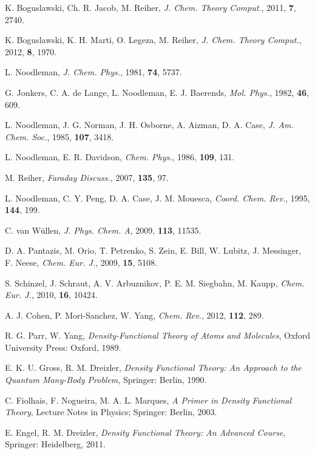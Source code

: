 \documentclass[%
 preprint, linenumbers,
 amsmath,amssymb,
 aps, physrev,
]{revtex4-2}
\begin{document}
\begin{thebibliography}{144}
 K. Boguslawski, Ch. R. Jacob, M. Reiher, \textit{J. Chem. Theory Comput.}, 2011, \textbf{7}, 2740.

 K. Boguslawski, K. H. Marti, O. Legeza, M. Reiher, \textit{J. Chem. Theory Comput.}, 2012, \textbf{8}, 1970.

 L. Noodleman, \textit{J. Chem. Phys.}, 1981, \textbf{74}, 5737.

 G. Jonkers, C. A. de Lange, L. Noodleman, E. J. Baerends, \textit{Mol. Phys.}, 1982, \textbf{46}, 609.

 L. Noodleman, J. G. Norman, J. H. Osborne, A. Aizman, D. A. Case, \textit{J. Am. Chem. Soc.}, 1985, \textbf{107}, 3418.

 L. Noodleman, E. R. Davidson, \textit{Chem. Phys.}, 1986, \textbf{109}, 131.

 M. Reiher, \textit{Faraday Discuss.}, 2007, \textbf{135}, 97.

 L. Noodleman, C. Y. Peng, D. A. Case, J. M. Mouesca, \textit{Coord. Chem. Rev.}, 1995, \textbf{144}, 199.

 C. van Wüllen, \textit{J. Phys. Chem. A}, 2009, \textbf{113}, 11535.

 D. A. Pantazis, M. Orio, T. Petrenko, S. Zein, E. Bill, W. Lubitz, J. Messinger, F. Neese, \textit{Chem. Eur. J.}, 2009, \textbf{15}, 5108.

 S. Schinzel, J. Schraut, A. V. Arbuznikov, P. E. M. Siegbahn, M. Kaupp, \textit{Chem. Eur. J.}, 2010, \textbf{16}, 10424.

 A. J. Cohen, P. Mori-Sanchez, W. Yang, \textit{Chem. Rev.}, 2012, \textbf{112}, 289.

 R. G. Parr, W. Yang, \textit{Density-Functional Theory of Atoms and Molecules}, Oxford University Press: Oxford, 1989.

 E. K. U. Gross, R. M. Dreizler, \textit{Density Functional Theory: An Approach to the Quantum Many-Body Problem}, Springer: Berlin, 1990.

 C. Fiolhais, F. Nogueira, M. A. L. Marques, \textit{A Primer in Density Functional Theory}, Lecture Notes in Physics; Springer: Berlin, 2003.

 E. Engel, R. M. Dreizler, \textit{Density Functional Theory: An Advanced Course}, Springer: Heidelberg, 2011.


\end{thebibliography}
\end{document}
